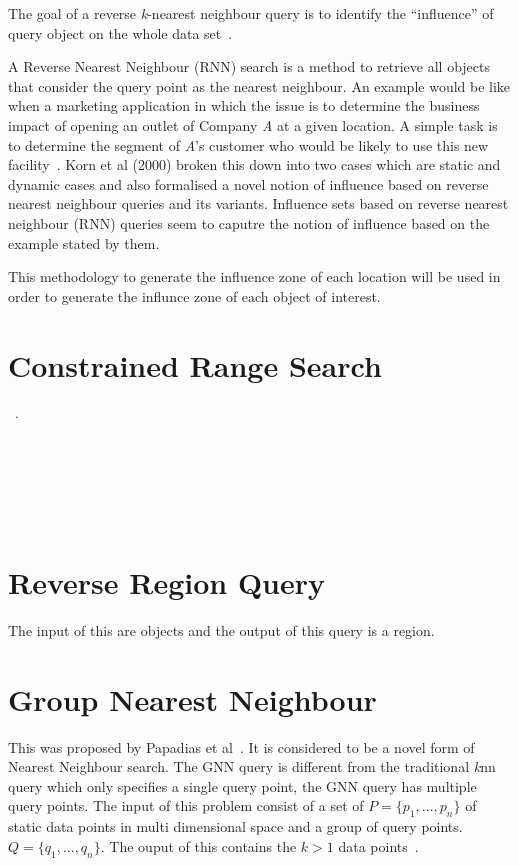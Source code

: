\documentclass[a4paper,11pt]{article}
\begin{document}
The goal of a reverse \textit{k}-nearest neighbour query is to identify the ``influence'' of query object on the whole data set~\cite{achtert2006efficient}. 

A Reverse Nearest Neighbour (RNN) search is a method to retrieve all objects that consider the query point as the nearest neighbour. An example would be like when a marketing application in which the issue is to determine the business impact of opening an outlet of Company \textit{A} at a given location. A simple task is to determine the segment of \textit{A}'s customer who would be likely to use this new facility~\cite{korn2000influence}. Korn et al (2000) broken this down into two cases which are static and dynamic cases and also formalised a novel notion of influence based on reverse nearest neighbour queries and its variants. Influence sets based on reverse nearest neighbour (RNN) queries seem to caputre the notion of influence based on the example stated by them.



This methodology to generate the influence zone of each location will be used in order to generate the influnce zone of each object of interest. 


\section{Constrained Range Search}

~\cite{xuan2011constrained}.

~\cite{kolahdouzan2004voronoi}

~\cite{zhao2008incremental}

~\cite{hu2006fast}

\section{Reverse Region Query}

The input of this are objects and the output of this query is a region. 

\section{Group Nearest Neighbour} 

This was proposed by Papadias et al~\cite{papadias2004group}. It is considered to be a novel form of Nearest Neighbour search. The GNN query is different from the traditional \textit{k}nn query which only specifies a single query point, the GNN query has multiple query points. The input of this problem consist of  a set of $P=\{p_1,...,p_n\}$ of static data points in multi dimensional space and a group of query points. $Q=\{q_1,...,q_n\}$. The ouput of this contains the $k>1$ data points~\cite{papadias2004group}. 
\end{document}
